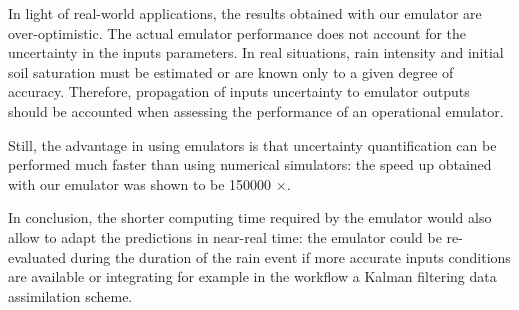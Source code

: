 In light of real-world applications, the results obtained with our emulator are over-optimistic.
The actual emulator performance does not account for the uncertainty in the inputs parameters. 
In real situations, rain intensity and initial soil saturation must be estimated or are known only to a given degree of accuracy. 
Therefore, propagation of inputs uncertainty to emulator outputs should be accounted when assessing the performance of an operational emulator.

Still, the advantage in using emulators is that uncertainty quantification can be performed much faster than using numerical simulators: the speed up obtained with our emulator was shown to be \num{150000} $\times$. 

In conclusion, the shorter computing time required by the emulator would also allow to adapt the predictions in near-real time: the emulator could be re-evaluated during the duration of the rain event if more accurate inputs conditions are available or integrating for example in the workflow a Kalman filtering data assimilation scheme. 

